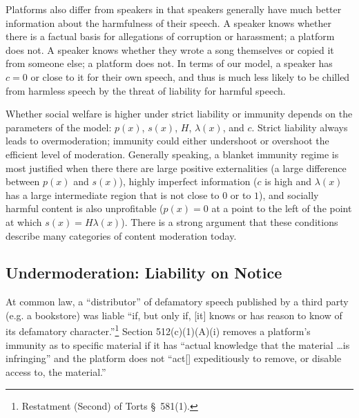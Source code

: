 Platforms also differ from speakers in that speakers generally have much better information about the harmfulness of their speech. A speaker knows whether there is a factual basis for allegations of corruption or harassment; a platform does not. A speaker knows whether they wrote a song themselves or copied it from someone else; a platform does not. In terms of our model, a speaker has $c = 0$ or close to it for their own speech, and thus is much less likely to be chilled from harmless speech by the threat of liability for harmful speech.

Whether social welfare is higher under strict liability or immunity depends on the parameters of the model:  $p(x)$, $s(x)$, $H$, $\lambda(x)$, and $c$. Strict liability always leads to overmoderation; immunity could either undershoot or overshoot the efficient level of moderation. Generally speaking, a blanket immunity regime is most justified when there there are large positive externalities (a large difference between $p(x)$ and $s(x)$), highly imperfect information ($c$ is high and $\lambda(x)$ has a large intermediate region that is not close to $0$ or to $1$), and socially harmful content is also unprofitable ($p(x) = 0$ at a point to the left of the point at which $s(x) = H\lambda(x)$). There is a strong argument that these conditions describe many categories of content moderation today.


\subsection{Undermoderation: Liability on Notice}

At common law, a ``distributor'' of defamatory speech published by a third party (e.g. a bookstore) was liable ``if, but only if, [it] knows or has reason to know of its defamatory character.''\footnote{Restatment (Second) of Torts §~581(1).}  Section 512(c)(1)(A)(i) removes a platform's immunity as to specific material if it has ``actual knowledge that the material \ldots is infringing'' and the platform does not ``act[] expeditiously to remove, or disable access to, the material.''

